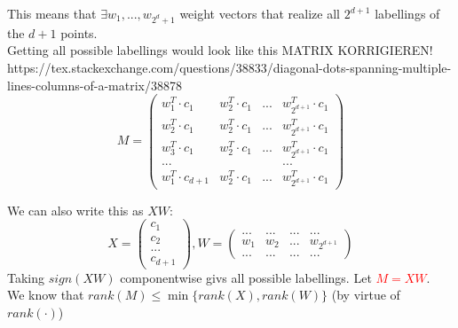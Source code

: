 \documentclass[10pt,a4paper]{article}
\theoremstyle{definition}
\theoremstyle{plain}
\begin{document}
	This means that $\exists w_1, ..., w_{2^d+1}$ weight vectors that realize all $2^{d+1}$ labellings of the $d+1$ points. \\
	Getting all possible labellings would look like this
	MATRIX KORRIGIEREN!  https://tex.stackexchange.com/questions/38833/diagonal-dots-spanning-multiple-lines-columns-of-a-matrix/38878
	$$
	M = \left(\begin{array}{cccc}
		w_1^T \cdot c_1 & w_2^T \cdot c_1 & ... & w_{2^{d+1}}^T \cdot c_1 \\
		w_2^T \cdot c_1 & w_2^T \cdot c_1 & ... & w_{2^{d+1}}^T \cdot c_1 \\
		w_3^T \cdot c_1 & w_2^T \cdot c_1 & ... & w_{2^{d+1}}^T \cdot c_1 \\
		... &   &   &  ... \\
		w_1^T \cdot c_{d+1} & w_2^T \cdot c_1 & ... & w_{2^{d+1}}^T \cdot c_1 \end{array}\right)
	$$
	
	We can also write this as $XW$:
	$$
		X = \left(\begin{array}{c}
			c_1 \\ c_2\\ ...\\ c_{d+1}
		\end{array}\right), 
		W = \left(\begin{array}{cccc}
			... & ... & ... & ...\\
			w_1 & w_2 & ... & w_{2^{d+1}}\\
			... & ... & ... & ...
		\end{array}\right)
	$$
	Taking $sign(XW)$ componentwise givs all possible labellings. Let \textcolor{red}{$M = XW$}.\\
	We know that $rank(M) \leq \min\{ rank(X), rank(W) \}$ (by virtue of $rank(\cdot)$)
\end{document}
